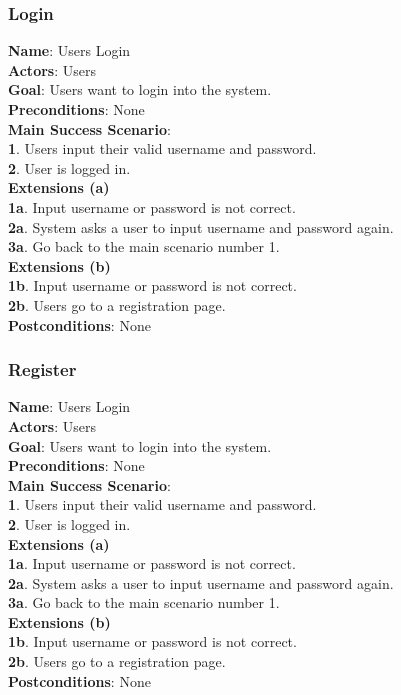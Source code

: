 \documentclass[12pt,oneside,openright,a4paper]{cpe-english-project}
\begin{document}
\subsubsection{Login}

\textbf{Name}: Users Login\\
\textbf{Actors}: Users\\
\textbf{Goal}: Users want to login into the system.\\
\textbf{Preconditions}: None\\
\textbf{Main Success Scenario}:\\
\textbf{1}. Users input their valid username and password.\\
\textbf{2}. User is logged in.\\
\textbf{Extensions (a)}\\
\textbf{1a}. Input username or password is not correct.\\
\textbf{2a}. System asks a user to input username and password again.\\
\textbf{3a}. Go back to the main scenario number 1.\\
\textbf{Extensions (b)}\\
\textbf{1b}. Input username or password is not correct.\\
\textbf{2b}. Users go to a registration page.\\
\textbf{Postconditions}: None

\subsubsection{Register}

\textbf{Name}: Users Login\\
\textbf{Actors}: Users\\
\textbf{Goal}: Users want to login into the system.\\
\textbf{Preconditions}: None\\
\textbf{Main Success Scenario}:\\
\textbf{1}. Users input their valid username and password.\\
\textbf{2}. User is logged in.\\
\textbf{Extensions (a)}\\
\textbf{1a}. Input username or password is not correct.\\
\textbf{2a}. System asks a user to input username and password again.\\
\textbf{3a}. Go back to the main scenario number 1.\\
\textbf{Extensions (b)}\\
\textbf{1b}. Input username or password is not correct.\\
\textbf{2b}. Users go to a registration page.\\
\textbf{Postconditions}: None
\end{document}
